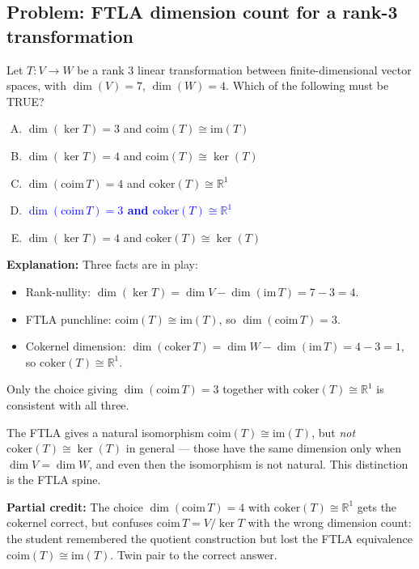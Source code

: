 \documentclass[12pt]{amsart}
\begin{document}
\subsection*{Problem: FTLA dimension count for a rank-3 transformation}

Let $T: V \to W$ be a rank 3 linear transformation between finite-dimensional
vector spaces, with $\dim(V) = 7$, $\dim(W) = 4$.
Which of the following must be TRUE?

\begin{enumerate}[(A)]
\item $\dim(\ker T) = 3$ and $\mathrm{coim}(T) \cong \mathrm{im}(T)$
\item $\dim(\ker T) = 4$ and $\mathrm{coim}(T) \cong \ker(T)$
\item $\dim(\mathrm{coim}\, T) = 4$ and $\mathrm{coker}(T) \cong \mathbb{R}^1$
\item \textcolor{blue}{\textbf{$\dim(\mathrm{coim}\, T) = 3$ and $\mathrm{coker}(T) \cong \mathbb{R}^1$}}
\item $\dim(\ker T) = 4$ and $\mathrm{coker}(T) \cong \ker(T)$
\end{enumerate}

\textbf{Explanation:}
Three facts are in play:
\begin{itemize}
\item Rank-nullity: $\dim(\ker T) = \dim V - \dim(\mathrm{im}\, T) = 7 - 3 = 4$.
\item FTLA punchline: $\mathrm{coim}(T) \cong \mathrm{im}(T)$, so $\dim(\mathrm{coim}\, T) = 3$.
\item Cokernel dimension: $\dim(\mathrm{coker}\, T) = \dim W - \dim(\mathrm{im}\, T) = 4 - 3 = 1$, so $\mathrm{coker}(T) \cong \mathbb{R}^1$.
\end{itemize}
Only the choice giving $\dim(\mathrm{coim}\, T) = 3$ together with
$\mathrm{coker}(T) \cong \mathbb{R}^1$ is consistent with all three.

The FTLA gives a natural isomorphism $\mathrm{coim}(T) \cong \mathrm{im}(T)$,
but \emph{not} $\mathrm{coker}(T) \cong \ker(T)$ in general --- those have
the same dimension only when $\dim V = \dim W$, and even then the isomorphism
is not natural. This distinction is the FTLA spine.

\textbf{Partial credit:}
The choice $\dim(\mathrm{coim}\, T) = 4$ with $\mathrm{coker}(T) \cong \mathbb{R}^1$
gets the cokernel correct, but confuses $\mathrm{coim}\, T = V/\ker T$ with
the wrong dimension count: the student remembered the quotient construction
but lost the FTLA equivalence $\mathrm{coim}(T) \cong \mathrm{im}(T)$.
Twin pair to the correct answer.
\end{document}
